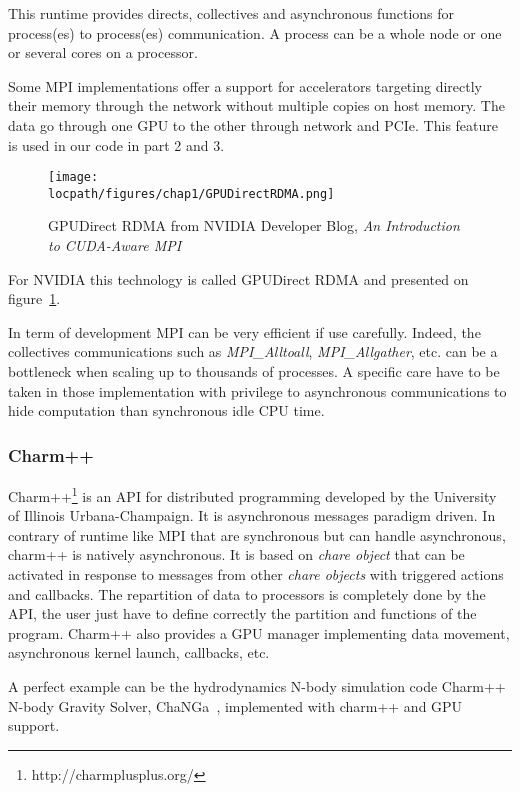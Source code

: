 This runtime provides directs, collectives and asynchronous functions for process(es) to process(es) communication.
A process can be a whole node or one or several cores on a processor.  

Some MPI implementations offer a support for accelerators targeting directly their memory through the network without multiple copies on host memory. 
The data go through one GPU to the other through network and PCIe.
This feature is used in our code in part 2 and 3.

\begin{figure}
\begin{center}
\texttt{[image: \\locpath/figures/chap1/GPUDirectRDMA.png]}
\caption{GPUDirect RDMA from NVIDIA Developer Blog, \textit{An Introduction to CUDA-Aware MPI
}}
\label{fig:1_HPC:gpudirect_rdma}
\end{center}
\end{figure}

For NVIDIA this technology is called GPUDirect RDMA and presented on figure~\ref{fig:1_HPC:gpudirect_rdma}. 

In term of development MPI can be very efficient if use carefully. 
Indeed, the collectives communications such as \textit{MPI\_Alltoall}, \textit{MPI\_Allgather}, etc. can be a bottleneck when scaling up to thousands of processes. 
A specific care have to be taken in those implementation with privilege to asynchronous communications to hide computation than synchronous idle CPU time. 

\subsubsection{Charm++}
Charm++\footnote{http://charmplusplus.org/} is an API for distributed programming developed by the University of Illinois Urbana-Champaign.
It is asynchronous messages paradigm driven.
In contrary of runtime like MPI that are synchronous but can handle asynchronous, charm++ is natively asynchronous. 
It is based on \textit{chare object} that can be activated in response to messages from other \textit{chare objects} with triggered actions and callbacks. 
The repartition of data to processors is completely done by the API, the user just have to define correctly the partition and functions of the program. 
Charm++ also provides a GPU manager implementing data movement, asynchronous kernel launch, callbacks, etc.

A perfect example can be the hydrodynamics N-body simulation code Charm++ N-body Gravity Solver, ChaNGa~\cite{jetley2010scaling}, implemented with charm++ and GPU support. 

